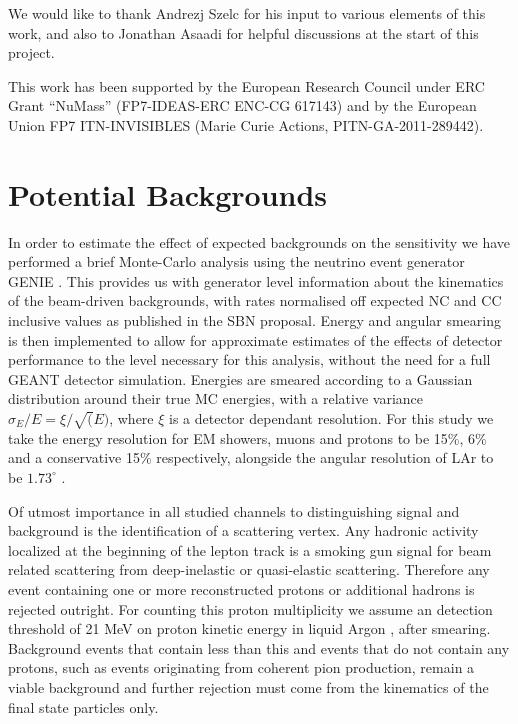 \documentclass[11pt, a4paper]{article}
\begin{document}
\acknowledgments

We would like to thank Andrezj Szelc for his input to various elements of this
work, and also to Jonathan Asaadi for helpful discussions at the start of this
project.

This work has been supported by the European Research Council under ERC Grant
“NuMass” (FP7-IDEAS-ERC ENC-CG 617143) and by the European Union FP7
ITN-INVISIBLES (Marie Curie Actions, PITN-GA-2011-289442).

\appendix

\section{Potential Backgrounds\label{sec:bg}}

In order to estimate the effect of expected backgrounds on the sensitivity we
have performed a brief Monte-Carlo analysis using the neutrino event generator GENIE
\cite{Andreopoulos:2009rq}. This provides us with generator level information about the
kinematics of the beam-driven backgrounds, with rates normalised off expected
NC and CC inclusive values as published in the SBN proposal. Energy and angular
smearing is then implemented to allow for approximate estimates of the effects
of detector performance to the level necessary for this analysis, without the
need for a full GEANT detector simulation. Energies are smeared according to a
Gaussian distribution around their true MC energies, with a relative variance
$\sigma_E/E = \xi/ \sqrt(E) $, where $\xi$ is a detector dependant resolution.
For this study we take the energy resolution for EM showers, muons and protons
to be 15\%, 6\% and a conservative 15\% respectively, alongside the angular
resolution of LAr to be $1.73^{\circ}$ \cite{Antonello:2015lea}. 

Of utmost importance in all studied channels to distinguishing signal and
background is the identification of a scattering vertex. Any hadronic activity
localized at the beginning of the lepton track is a smoking gun signal for beam
related scattering from deep-inelastic or quasi-elastic scattering. Therefore
any event containing one or more reconstructed protons or additional hadrons is
rejected outright. For counting this proton multiplicity we assume an detection
threshold of 21 MeV on proton kinetic energy in liquid Argon \cite{Acciarri:2014gev}, after smearing.
Background events that contain less than this and events that do not contain
any protons, such as events originating from coherent pion production, remain a
viable background and further rejection must come from the kinematics of the
final state particles only.
\end{document}
